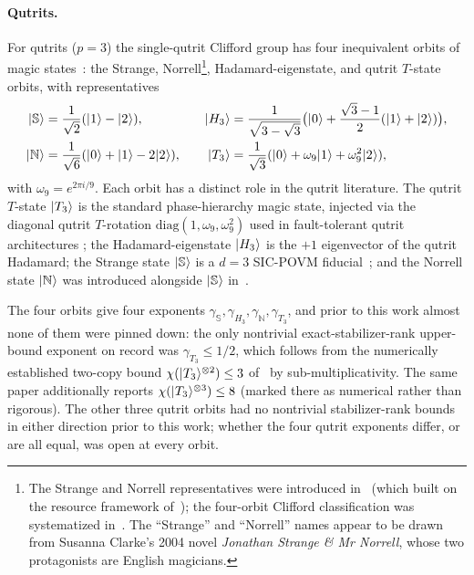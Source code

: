 \documentclass[11pt]{article}
\theoremstyle{definition}
\newcommand{\microspace}{\mspace{0.5mu}}
\newcommand{\ket}[1]{\lvert\microspace #1 \microspace \rangle}
\newcommand{\chiR}{\chi}
\newcommand{\Strange}{\ket{\mathbb{S}}}
\newcommand{\Hth}{\ket{H_3}}
\newcommand{\Norrell}{\ket{\mathbb{N}}}
\newcommand{\Tth}{\ket{T_3}}
\begin{document}
	\paragraph{Qutrits.}
	For qutrits ($p = 3$) the single-qutrit Clifford group has four
	inequivalent orbits of
	magic states~\cite{veitch2014resource, jain2020qutrit}:
	the Strange, Norrell\footnote{The Strange and Norrell
	representatives were introduced in~\cite{veitch2014resource}
	(which built on the resource framework
	of~\cite{veitch2012negative, howard2014contextuality}); the
	four-orbit Clifford classification was systematized
	in~\cite{jain2020qutrit}. The ``Strange'' and ``Norrell'' names
	appear to be drawn from Susanna Clarke's 2004 novel
	\emph{Jonathan Strange \& Mr Norrell}, whose two protagonists are
	English magicians.}, Hadamard-eigenstate, and qutrit $T$-state
	orbits, with
	representatives
	\begin{equation}\label{eq:four-states}
		\begin{aligned}
			\Strange &= \frac{1}{\sqrt{2}} (\ket{1} - \ket{2}),
			&\quad
			\Hth &= \frac{1}{\sqrt{3 - \sqrt 3}} \big( \ket{0} + \frac{\sqrt{3}-1}{2}(\ket{1} + \ket{2}) \big),
			\\
			\Norrell &= \frac{1}{\sqrt{6}}(\ket{0} + \ket{1} - 2\ket{2}),
			&\quad
			\Tth &= \frac{1}{\sqrt{3}}(\ket{0} + \omega_9 \ket{1} + \omega_9^2 \ket{2}),
		\end{aligned}
	\end{equation}
	with $\omega_9 = e^{2 \pi i / 9}$. Each orbit has a distinct role
	in the qutrit literature. The qutrit $T$-state $\Tth$ is the
	standard phase-hierarchy magic state, injected via the diagonal
	qutrit $T$-rotation
	$\mathrm{diag}(1, \omega_9, \omega_9^2)$ \cite{howard2012qudit}
	used in fault-tolerant qutrit
	architectures \cite{anwar2012qutrit, campbell2012magic, dawkins2015qutrit};
	the Hadamard-eigenstate $\Hth$ is the $+1$ eigenvector of the
	qutrit Hadamard; the Strange state $\Strange$ is a $d = 3$
	SIC-POVM fiducial~\cite{appleby2005symmetric, zhu2010sic}; and
	the Norrell state $\Norrell$ was introduced alongside $\Strange$
	in~\cite{veitch2014resource}.
	
	The four orbits give four exponents
	$\gamma_{\mathbb{S}}, \gamma_{H_3}, \gamma_{\mathbb{N}}, \gamma_{T_3}$, and
	prior to this work almost none of them were pinned down: the only
	nontrivial exact-stabilizer-rank upper-bound exponent on record
	was $\gamma_{T_3} \le 1/2$, which follows from the numerically
	established two-copy bound $\chiR(\Tth^{\otimes 2}) \le 3$
	of~\cite{kocia2021improved} by sub-multiplicativity. The same
	paper additionally reports $\chiR(\Tth^{\otimes 3}) \le 8$
	(marked there as numerical rather than rigorous). The other
	three qutrit orbits had no nontrivial stabilizer-rank bounds in
	either direction prior to this work; whether the four qutrit
	exponents differ, or are all equal, was open at every orbit.
	
\end{document}
